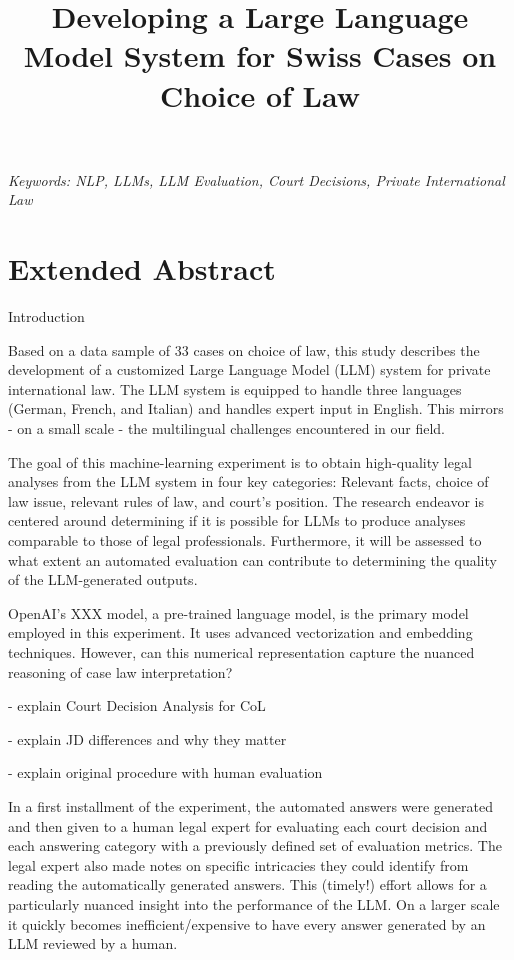 \documentclass[a4paper,12pt]{article}
\title{Developing a Large Language Model System for Swiss Cases on Choice of Law}
\date{}
\begin{document}
\maketitle
\thispagestyle{fancy}

\begin{center}
\textit{Keywords: NLP, LLMs, LLM Evaluation, Court Decisions, Private International Law}
\newline
\end{center}

\section*{Extended Abstract}

Introduction

Based on a data sample of 33 cases on choice of law, this study describes the development of a customized Large Language Model (LLM) system for private international law. The LLM system is equipped to handle three languages (German, French, and Italian) and handles expert input in English. This mirrors - on a small scale - the multilingual challenges encountered in our field.

The goal of this machine-learning experiment is to obtain high-quality legal analyses from the LLM system in four key categories: Relevant facts, choice of law issue, relevant rules of law, and court's position. The research endeavor is centered around determining if it is possible for LLMs to produce analyses comparable to those of legal professionals. Furthermore, it will be assessed to what extent an automated evaluation can contribute to determining the quality of the LLM-generated outputs.

OpenAI's XXX model, a pre-trained language model, is the primary model employed in this experiment. It uses advanced vectorization and embedding techniques. However, can this numerical representation capture the nuanced reasoning of case law interpretation?

- explain Court Decision Analysis for CoL

	- explain JD differences and why they matter

  - explain original procedure with human evaluation

In a first installment of the experiment, the automated answers were generated and then given to a human legal expert for evaluating each court decision and each answering category with a previously defined set of evaluation metrics. The legal expert also made notes on specific intricacies they could identify from reading the automatically generated answers. This (timely!) effort allows for a particularly nuanced insight into the performance of the LLM. On a larger scale it quickly becomes inefficient/expensive to have every answer generated by an LLM reviewed by a human.
\end{document}
